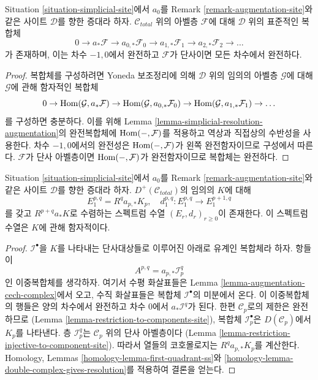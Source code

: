\begin{lemma}
\label{lemma-augmentation-cech-complex}
Situation \ref{situation-simplicial-site}에서 $a_0$를 Remark
\ref{remark-augmentation-site}와 같은 사이트 $\mathcal{D}$를 향한
증대라 하자. $\mathcal{C}_{total}$ 위의 아벨층 $\mathcal{F}$에 대해
$\mathcal{D}$ 위의 표준적인 복합체
$$
0 \to a_*\mathcal{F} \to a_{0, *}\mathcal{F}_0 \to a_{1, *}\mathcal{F}_1 \to
a_{2, *}\mathcal{F}_2 \to \ldots
$$
가 존재하며, 이는 차수 $-1, 0$에서 완전하고
$\mathcal{F}$가 단사이면 모든 차수에서 완전하다.
\end{lemma}

\begin{proof}
복합체를 구성하려면 Yoneda 보조정리에 의해
$\mathcal{D}$ 위의 임의의 아벨층 $\mathcal{G}$에 대해
$\mathcal{G}$에 관해 함자적인 복합체
$$
0 \to \mathop{\mathrm{Hom}}\nolimits(\mathcal{G}, a_*\mathcal{F}) \to
\mathop{\mathrm{Hom}}\nolimits(\mathcal{G}, a_{0, *}\mathcal{F}_0) \to
\mathop{\mathrm{Hom}}\nolimits(\mathcal{G}, a_{1, *}\mathcal{F}_1) \to \ldots
$$
를 구성하면 충분하다. 이를 위해
Lemma \ref{lemma-simplicial-resolution-augmentation}의 완전복합체에
$\mathop{\mathrm{Hom}}\nolimits(-, \mathcal{F})$를 적용하고 역상과 직접상의 수반성을 사용한다.
차수 $-1, 0$에서의 완전성은 $\mathop{\mathrm{Hom}}\nolimits(-, \mathcal{F})$가 왼쪽 완전함자이므로
구성에서 따른다. $\mathcal{F}$가 단사 아벨층이면
$\mathop{\mathrm{Hom}}\nolimits(-, \mathcal{F})$가 완전함자이므로 복합체는 완전하다.
\end{proof}

\begin{lemma}
\label{lemma-augmentation-spectral-sequence}
Situation \ref{situation-simplicial-site}에서 $a_0$를 Remark
\ref{remark-augmentation-site}와 같은 사이트 $\mathcal{D}$를 향한
증대라 하자. $D^+(\mathcal{C}_{total})$의 임의의 $K$에 대해
$$
E_1^{p, q} = R^qa_{p, *} K_p,\quad
d_1^{p, q} : E_1^{p, q} \to E_1^{p + 1, q}
$$
를 갖고 $R^{p + q}a_*K$로 수렴하는 스펙트럼 수열
$(E_r, d_r)_{r \geq 0}$이 존재한다.
이 스펙트럼 수열은 $K$에 관해 함자적이다.
\end{lemma}

\begin{proof}
$\mathcal{I}^\bullet$을 $K$를 나타내는 단사대상들로 이루어진
아래로 유계인 복합체라 하자. 항들이
$$
A^{p, q} = a_{p, *}\mathcal{I}^q_p
$$
인 이중복합체를 생각하자. 여기서 수평 화살표들은
Lemma \ref{lemma-augmentation-cech-complex}에서 오고,
수직 화살표들은 복합체 $\mathcal{I}^\bullet$의 미분에서 온다.
이 이중복합체의 행들은 양의 차수에서 완전하고 차수 $0$에서
$a_*\mathcal{I}^q$가 된다. 한편 $\mathcal{C}_p$로의 제한은 완전하므로
(Lemma \ref{lemma-restriction-to-components-site}),
복합체 $\mathcal{I}_p^\bullet$은 $D(\mathcal{C}_p)$에서 $K_p$를 나타낸다.
층 $\mathcal{I}_p^q$는 $\mathcal{C}_p$ 위의 단사 아벨층이다
(Lemma \ref{lemma-restriction-injective-to-component-site}).
따라서 열들의 코호몰로지는 $R^qa_{p, *}K_p$를 계산한다.
Homology, Lemmas \ref{homology-lemma-first-quadrant-ss}와
\ref{homology-lemma-double-complex-gives-resolution}를 적용하여 결론을 얻는다.
\end{proof}

